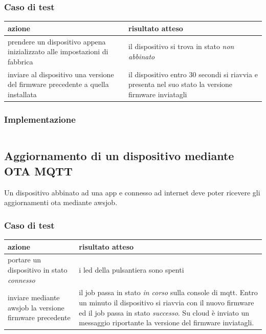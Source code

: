 \documentclass[12pt,a4paper,twoside,titlepage]{book}
\begin{document}
\subsubsection{Caso di test}
\begin{center}
\begin{tabular}{| p{} | p{} |}
    \hline \textbf{azione} & \textbf{risultato atteso} \\
    \hline prendere un dispositivo appena inizializzato alle impostazioni di fabbrica & il dispositivo si trova in stato \textit{non abbinato} \\
    \hline inviare al dispositivo una versione del \gls{firmware} precedente a quella installata & il dispositivo entro 30 secondi si riavvia e presenta nel suo stato la versione \gls{firmware} inviatagli \\
    \hline
\end{tabular}
\end{center}

\subsubsection{Implementazione}
\inputminted[]{python3}{src/test_downgrade.py}

\subsection{Aggiornamento di un dispositivo mediante OTA MQTT}
\label{section:test_ota}

Un dispositivo abbinato ad una app e connesso ad internet deve poter ricevere gli
aggiornamenti \acrshort{ota} mediante \Gls{awsjob}.

\subsubsection{Caso di test}
\begin{center}
\begin{tabular}{| p{} | p{} |}
    \hline \textbf{azione} & \textbf{risultato atteso} \\
    \hline portare un dispositivo in stato \textit{connesso} & i \acrshort{led} della pulsantiera sono spenti \\
    \hline inviare mediante \Gls{awsjob} la versione \gls{firmware} precedente & il job passa in stato \textit{in corso} sulla console di \Gls{mqtt}. Entro un minuto il dispositivo si riavvia con il nuovo \gls{firmware} ed il job passa in stato \textit{successo}. Su cloud è inviato un messaggio riportante la versione del \gls{firmware} inviatagli. \\
    \hline
\end{tabular}
\end{center}
\end{document}

